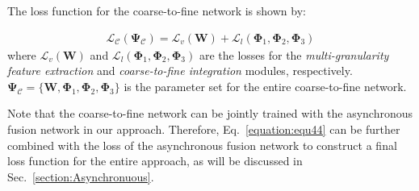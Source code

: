 \documentclass[letterpaper]{article} %
\begin{document}
The loss function for the coarse-to-fine network is shown by: %

\begin{equation}
\begin{aligned}
\mathcal{L}_{\mathcal{C}}(\mathbf{\Psi}_{\mathcal{C}})=\mathcal{L}_v(\mathbf{W})+\mathcal{L}_l(\mathbf{\Phi}_1,\mathbf{\Phi}_2,\mathbf{\Phi}_3)%
\end{aligned}
\label{equation:equ44}
\end{equation}
where $\mathcal{L}_v(\mathbf{W})$ and $\mathcal{L}_l(\mathbf{\Phi}_1,\mathbf{\Phi}_2,\mathbf{\Phi}_3)$ are the losses for the \emph{multi-granularity feature extraction} and \emph{coarse-to-fine integration} modules, respectively. $\mathbf{\Psi_{\mathcal{C}}}=\{\mathbf{W},\mathbf{\Phi}_1,\mathbf{\Phi}_2,\mathbf{\Phi}_3\}$ is the parameter set for the entire coarse-to-fine network.%

Note that the coarse-to-fine network can be jointly trained with the asynchronous fusion network in our approach. Therefore, Eq.~\ref{equation:equ44} can be further combined with the loss of the asynchronous fusion network to construct a final loss function for the entire approach, as will be discussed in Sec.~\ref{section:Asynchronuous}.




\end{document}
